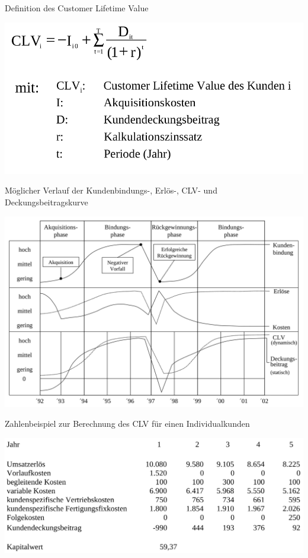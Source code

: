\documentclass[12pt,ngerman,a4paper,ignorenonframetext,]{beamer}
\begin{document}
\begin{frame}{Definition des Customer Lifetime Value}
\protect\hypertarget{definition-des-customer-lifetime-value}{}

\begin{center}\includegraphics[width=0.8\linewidth]{./images/Marketingcontrolling/CLV} \end{center}

\end{frame}

\begin{frame}{Möglicher Verlauf der Kundenbindungs-, Erlös-, CLV- und
Deckungsbeitragskurve}
\protect\hypertarget{moglicher-verlauf-der-kundenbindungs--erlos--clv--und-deckungsbeitragskurve}{}

\begin{center}\includegraphics[width=0.8\linewidth]{./images/Marketingcontrolling/CLV2} \end{center}

\end{frame}

\begin{frame}{Zahlenbeispiel zur Berechnung des CLV für einen
Individualkunden}
\protect\hypertarget{zahlenbeispiel-zur-berechnung-des-clv-fur-einen-individualkunden}{}

\begin{center}\includegraphics[width=0.8\linewidth]{./images/Marketingcontrolling/CLV3} \end{center}

\end{frame}
\end{document}
